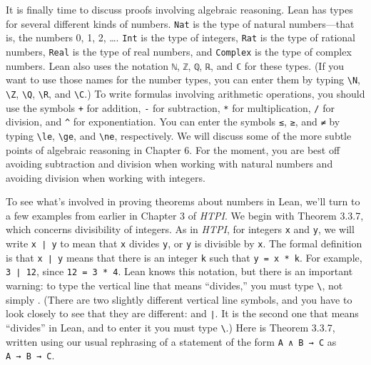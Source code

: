 \documentclass[
  letterpaper,
  DIV=11,
  numbers=noendperiod]{scrreprt}
\theoremstyle{remark}
\begin{document}
It is finally time to discuss proofs involving algebraic reasoning. Lean
has types for several different kinds of numbers. \texttt{Nat} is the
type of natural numbers---that is, the numbers 0, 1, 2, \ldots.
\texttt{Int} is the type of integers, \texttt{Rat} is the type of
rational numbers, \texttt{Real} is the type of real numbers, and
\texttt{Complex} is the type of complex numbers. Lean also uses the
notation \texttt{ℕ}, \texttt{ℤ}, \texttt{ℚ}, \texttt{ℝ}, and \texttt{ℂ}
for these types. (If you want to use those names for the number types,
you can enter them by typing \texttt{\textbackslash{}N},
\texttt{\textbackslash{}Z}, \texttt{\textbackslash{}Q},
\texttt{\textbackslash{}R}, and \texttt{\textbackslash{}C}.) To write
formulas involving arithmetic operations, you should use the symbols
\texttt{+} for addition, \texttt{-} for subtraction, \texttt{*} for
multiplication, \texttt{/} for division, and \texttt{\^{}} for
exponentiation. You can enter the symbols \texttt{≤}, \texttt{≥}, and
\texttt{≠} by typing \texttt{\textbackslash{}le},
\texttt{\textbackslash{}ge}, and \texttt{\textbackslash{}ne},
respectively. We will discuss some of the more subtle points of
algebraic reasoning in Chapter 6. For the moment, you are best off
avoiding subtraction and division when working with natural numbers and
avoiding division when working with integers.

To see what's involved in proving theorems about numbers in Lean, we'll
turn to a few examples from earlier in Chapter 3 of \emph{HTPI}. We
begin with Theorem 3.3.7, which concerns divisibility of integers. As in
\emph{HTPI}, for integers \texttt{x} and \texttt{y}, we will write
\texttt{x\ ∣\ y} to mean that \texttt{x} divides \texttt{y}, or
\texttt{y} is divisible by \texttt{x}. The formal definition is that
\texttt{x\ ∣\ y} means that there is an integer \texttt{k} such that
\texttt{y\ =\ x\ *\ k}. For example, \texttt{3\ ∣\ 12}, since
\texttt{12\ =\ 3\ *\ 4}. Lean knows this notation, but there is an
important warning: to type the vertical line that means ``divides,'' you
must type \texttt{\textbackslash{}\textbar{}}, not simply
\texttt{\textbar{}}. (There are two slightly different vertical line
symbols, and you have to look closely to see that they are different:
\texttt{\textbar{}} and \texttt{∣}. It is the second one that means
``divides'' in Lean, and to enter it you must type
\texttt{\textbackslash{}\textbar{}}.) Here is Theorem 3.3.7, written
using our usual rephrasing of a statement of the form
\texttt{A\ ∧\ B\ →\ C} as \texttt{A\ →\ B\ →\ C}.
\end{document}
